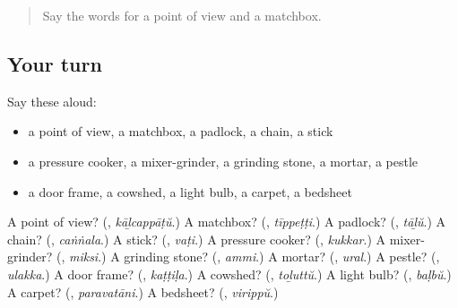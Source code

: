 \begin{quote}
Say the words for a point of view and a matchbox.
\end{quote}

\subsection*{Your turn}
Say these aloud:

\begin{itemize}
\raggedright
  \item a point of view, a matchbox, a padlock, a chain, a stick
  \item a pressure cooker, a mixer-grinder, a grinding stone, a mortar, a pestle
  \item a door frame, a cowshed, a light bulb, a carpet, a bedsheet
\end{itemize}

\begin{tcolorbox}[breakable,colback=teal!4,colframe=teal!35!black,title={Before you move on}]
A point of view? (\textbf{}, \emph{kāḻcappāṭŭ}.) A matchbox? (\textbf{}, \emph{tīppeṭṭi}.) A padlock? (\textbf{}, \emph{tāḻŭ}.) A chain? (\textbf{}, \emph{caṅṅala}.) A stick? (\textbf{}, \emph{vaṭi}.) A pressure cooker? (\textbf{}, \emph{kukkar}.) A mixer-grinder? (\textbf{}, \emph{miksi}.) A grinding stone? (\textbf{}, \emph{ammi}.) A mortar? (\textbf{}, \emph{ural}.) A pestle? (\textbf{}, \emph{ulakka}.) A door frame? (\textbf{}, \emph{kaṭṭiḷa}.) A cowshed? (\textbf{}, \emph{toḻuttŭ}.) A light bulb? (\textbf{}, \emph{baḷbŭ}.) A carpet? (\textbf{}, \emph{paravatāni}.) A bedsheet? (\textbf{}, \emph{virippŭ}.)
\end{tcolorbox}
